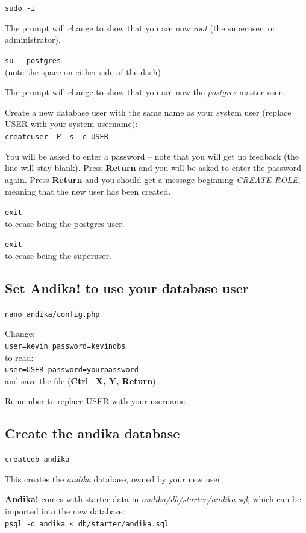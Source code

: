 \verb|sudo -i|

The prompt will change to show that you are now \textit{root} (the superuser, or administrator).

\verb|su - postgres|\\
(note the space on either side of the dash)

The prompt will change to show that you are now the \textit{postgres} master user.

Create a new database user with the same name as your system user (replace USER with your system username):\\
\verb|createuser -P -s -e USER|

You will be asked to enter a password -- note that you will get no feedback (the line will stay blank).  Press \textbf{Return} and you will be asked to enter the password again.  Press \textbf{Return} and you should get a message beginning \textit{CREATE ROLE}, meaning that the new user has been created.

\verb|exit|\\
to cease being the postgres user.

\verb|exit|\\
to cease being the superuser.


\subsection{Set Andika! to use your database user}

\verb|nano andika/config.php|

Change:\\
\verb|user=kevin password=kevindbs|\\
to read:\\
\verb|user=USER password=yourpassword|\\
and save the file (\textbf{Ctrl+X, Y, Return}).

Remember to replace USER with your username.


\subsection{Create the andika database}

\verb|createdb andika|

This creates the \textit{andika} database, owned by your new user.

\textbf{Andika!} comes with starter data in \textit{andika/db/starter/andika.sql}, which can be imported into the new database:\\
\verb|psql -d andika < db/starter/andika.sql|

